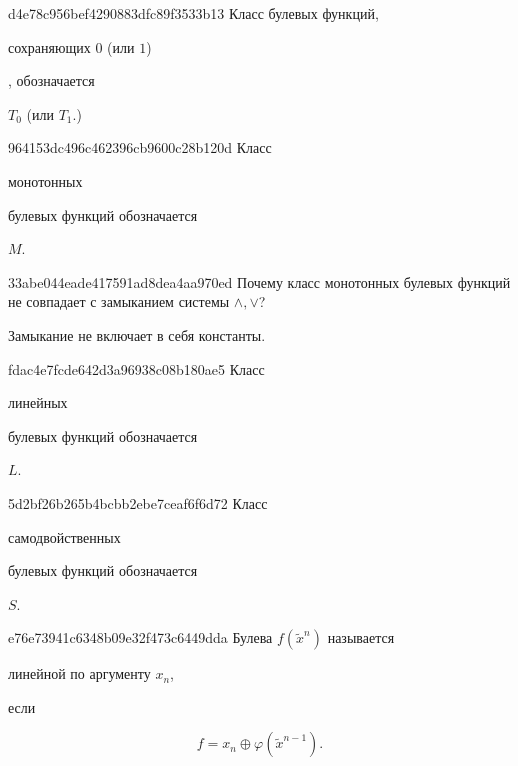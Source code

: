 \begin{note}{d4e78c956bef4290883dfc89f3533b13}
    Класс булевых функций, \begin{icloze}{2}сохраняющих \({ 0 }\) (или \({ 1 }\))\end{icloze}, обозначается \begin{icloze}{1}\({ T_0 }\) (или \({ T_1 }\).)\end{icloze}
\end{note}

\begin{note}{964153dc496c462396cb9600c28b120d}
    Класс \begin{icloze}{2}монотонных\end{icloze} булевых функций обозначается \begin{icloze}{1}\({ M }\).\end{icloze}
\end{note}

\begin{note}{33abe044eade417591ad8dea4aa970ed}
    Почему класс монотонных булевых функций не совпадает с замыканием системы \({ \land, \lor }\)?

    \begin{cloze}{1}
        Замыкание не включает в себя константы.
    \end{cloze}
\end{note}

\begin{note}{fdac4e7fcde642d3a96938c08b180ae5}
    Класс \begin{icloze}{2}линейных\end{icloze} булевых функций обозначается \begin{icloze}{1}\({ L }\).\end{icloze}
\end{note}

\begin{note}{5d2bf26b265b4bcbb2ebe7ceaf6f6d72}
    Класс \begin{icloze}{2}самодвойственных\end{icloze} булевых функций обозначается \begin{icloze}{1}\({ S }\).\end{icloze}
\end{note}

\begin{note}{e76e73941c6348b09e32f473c6449dda}
    Булева \({ f(\widetilde x^{n}) }\) называется \begin{icloze}{2}линейной по аргументу \({ x_n }\),\end{icloze} если
    \begin{icloze}{1}
        \[
            f = x_n \oplus \varphi(\widetilde x^{n-1}).
        \]
    \end{icloze}
\end{note}

